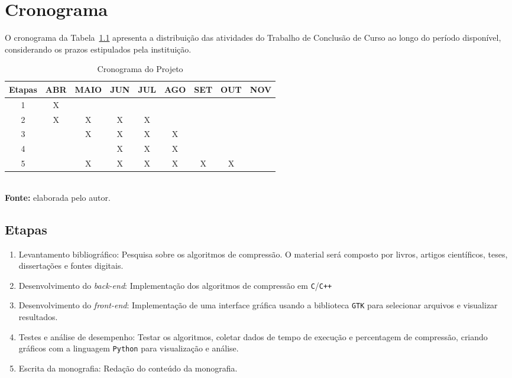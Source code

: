 \chapter{Cronograma}
\label{c.cronograma}

O cronograma da Tabela~\ref{tab:cronograma} apresenta a distribuição das atividades do Trabalho de Conclusão de Curso ao longo do período disponível, considerando os prazos estipulados pela instituição.

\begin{table}[htb]
    \centering
    \renewcommand{\arraystretch}{1.3}
    \caption{Cronograma do Projeto} %
    \begin{tabular}{|c|c|c|c|c|c|c|c|c|}
        \hline
        \textbf{Etapas} & \textbf{ABR} & \textbf{MAIO} & \textbf{JUN} & \textbf{JUL} & \textbf{AGO} & \textbf{SET} & \textbf{OUT} & \textbf{NOV} \\
        \hline
        1 & X &   &   &   &   &   &   &   \\
        \hline
        2 & X & X & X & X &   &   &   &   \\
        \hline
        3 &   & X & X & X & X &   &   &   \\
        \hline
        4 &   &   & X & X & X &   &   &   \\
        \hline
	5 &   & X & X & X & X & X & X &   \\
	\hline
    \end{tabular}
    \vspace{2mm} \\ %
    \textbf{Fonte:} elaborada pelo autor. %
    \label{tab:cronograma} %
\end{table}

\section*{Etapas}
\begin{enumerate}
    \item Levantamento bibliográfico: Pesquisa sobre os algoritmos de compressão. O material será composto por livros, artigos científicos, teses, dissertações e fontes digitais. 
    \item Desenvolvimento do \textit{back-end}: Implementação dos algoritmos de compressão em \texttt{C}/\texttt{C++}
    \item Desenvolvimento do \textit{front-end}: Implementação de uma interface gráfica usando a biblioteca \texttt{GTK} para selecionar arquivos e visualizar resultados.
    \item Testes e análise de desempenho: Testar os algoritmos, coletar dados de tempo de execução e percentagem de compressão, criando gráficos com a linguagem \texttt{Python} para visualização e análise.
    \item Escrita da monografia: Redação do conteúdo da monografia.
\end{enumerate}
